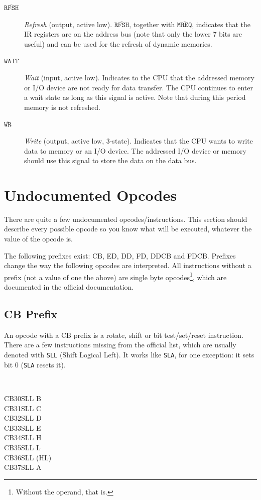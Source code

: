 \documentclass[oneside,a4paper]{book}
\begin{document}
\begin{description}
\item[$\mathtt{\overline{RFSH}}$]
  {\em Refresh} (output, active low). $\mathtt{\overline{RFSH}}$, together
  with $\mathtt{\overline{MREQ}}$, indicates that the IR registers are on
  the address bus (note that only the lower 7 bits are useful) and can be 
  used for the refresh of dynamic memories.

\item[$\mathtt{\overline{WAIT}}$]
  {\em Wait} (input, active low). Indicates to the CPU that the addressed
  memory or I/O device are not ready for data transfer. The CPU continues
  to enter a wait state as long as this signal is active. Note that during
  this period memory is not refreshed.

\item[$\mathtt{\overline{WR}}$]
  {\em Write} (output, active low, 3-state). Indicates that the 
  CPU wants to write data to memory or an I/O device. The addressed I/O device
  or memory should use this signal to store the data on the data bus.

\end{description}

\chapter{Undocumented Opcodes}

There are quite a few undocumented opcodes/instructions. This section 
should describe every possible opcode so you know what will be executed, 
whatever the value of the opcode is.

The following prefixes exist: CB, ED, DD, FD, DDCB and FDCB. Prefixes change 
the way the following opcodes are interpreted. All instructions without a 
prefix (not a value of one the above) are single byte opcodes\footnote{
Without the operand, that is.}, which are documented in the official 
documentation.

\section{CB Prefix \cite{gerton}}
\label{prefix_cb}

An opcode with a CB prefix is a rotate, shift or bit test/set/reset 
instruction. There are a few instructions missing from the official list, 
which are usually denoted with {\tt SLL} (Shift Logical Left). It works like 
{\tt SLA}, for one exception: it sets bit 0 ({\tt SLA} resets it).

{\tt
  \begin{tabbing}
    {\qquad}\=CB30\qquad\=SLL B \+\\
       CB31\>SLL C\\
       CB32\>SLL D\\
       CB33\>SLL E\\
       CB34\>SLL H\\
       CB35\>SLL L\\
       CB36\>SLL (HL)\\
       CB37\>SLL A
\end{tabbing}
}
\end{document}
